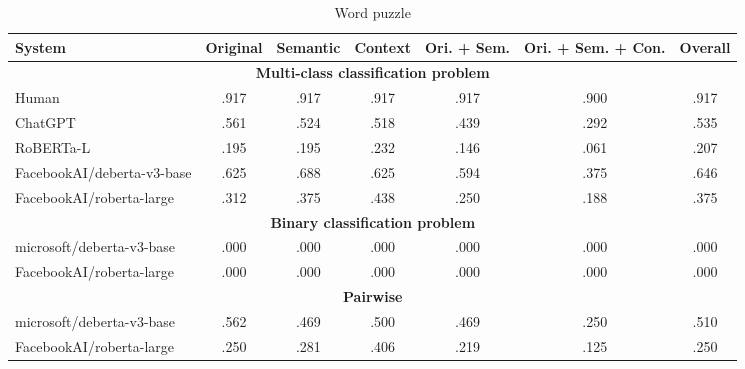 \begin{table*}
	\caption{Word puzzle}
	\label{tab:word-results-table}
	\begin{center}
		\begin{tabular}{lcccccc}
			\toprule
			\textbf{System}           & \textbf{Original} & \textbf{Semantic} & \textbf{Context} & \textbf{Ori. + Sem.} & \textbf{Ori. + Sem. + Con.} & \textbf{Overall} \\
			\midrule
			\multicolumn{7}{c}{\textbf{Multi-class classification problem}}                                                                                              \\
			\midrule
			\color{gray}Human         & \color{gray}.917  & \color{gray}.917  & \color{gray}.917 & \color{gray}.917     & \color{gray}.900            & \color{gray}.917 \\
			\color{gray}ChatGPT       & \color{gray}.561  & \color{gray}.524  & \color{gray}.518 & \color{gray}.439     & \color{gray}.292            & \color{gray}.535 \\
			\color{gray}RoBERTa-L     & \color{gray}.195  & \color{gray}.195  & \color{gray}.232 & \color{gray}.146     & \color{gray}.061            & \color{gray}.207 \\
			\midrule
			FacebookAI/deberta-v3-base           & .625              & .688              & .625             & .594                 & .375                        & .646             \\
			FacebookAI/roberta-large  & .312              & .375              & .438             & .250                 & .188                        & .375             \\
			\midrule
			\multicolumn{7}{c}{\textbf{Binary classification problem}}                                                                                                   \\
			\midrule
			microsoft/deberta-v3-base & .000              & .000              & .000             & .000                 & .000                        & .000             \\
			FacebookAI/roberta-large  & .000              & .000              & .000             & .000                 & .000                        & .000             \\
			\midrule
			\multicolumn{7}{c}{\textbf{Pairwise}}                                                                                                                        \\
			\midrule
			microsoft/deberta-v3-base & .562              & .469              & .500             & .469                 & .250                        & .510             \\
			FacebookAI/roberta-large & .250 & .281 & .406 & .219 & .125 & .250 \\
			\bottomrule
		\end{tabular}
	\end{center}
\end{table*}

